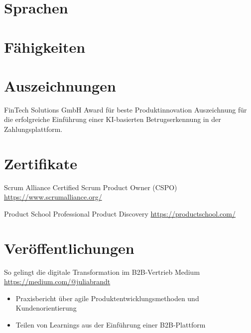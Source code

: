 \documentclass[a4paper, serif, 10pt]{moderncv}
\begin{document}
\section{Sprachen}

\section{Fähigkeiten}

\section{Auszeichnungen}

        {FinTech Solutions GmbH}
        {Award für beste Produktinnovation}
        {}
        {}
        {Auszeichnung für die erfolgreiche Einführung einer KI-basierten Betrugserkennung in der Zahlungsplattform.}
\section{Zertifikate}

        {Scrum Alliance}
        {Certified Scrum Product Owner (CSPO)}
        {\url{https://www.scrumalliance.org/}}
        {}
        {}

        {Product School}
        {Professional Product Discovery}
        {\url{https://productschool.com/}}
        {}
        {}
\section{Veröffentlichungen}

        {So gelingt die digitale Transformation im B2B-Vertrieb}
        {Medium}
        {\url{https://medium.com/@juliabrandt}}
        {}
        {\begin{itemize}
\item Praxisbericht über agile Produktentwicklungsmethoden und Kundenorientierung
\item Teilen von Learnings aus der Einführung einer B2B-Plattform
\end{itemize}}
\end{document}
